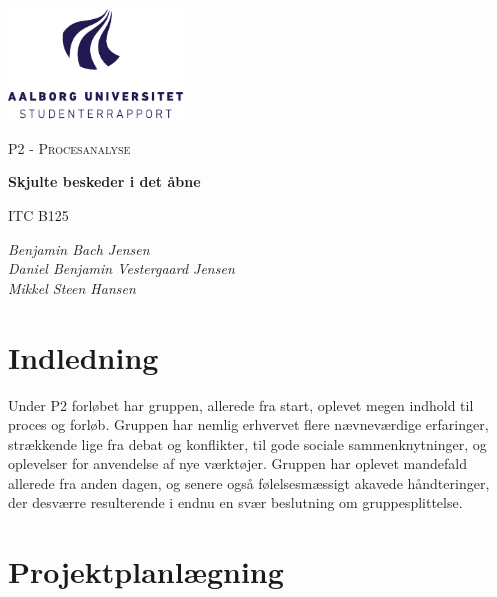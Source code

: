 \documentclass[11pt]{article}
\renewcommand{\baselinestretch}{1.20}
\begin{document}
\begin{titlepage}
    \centering
	\includegraphics[width=0.35\textwidth]{Projectdoc/Assets/Illustrationer/aau_logo_da.pdf}\par\vspace{1cm}
	{\scshape\Large P2 - Procesanalyse\par}
	\vspace{0.2cm}
	{\huge\bfseries Skjulte beskeder i det åbne\par}
	\vspace{0.2cm}
	{\scshape\Large ITC B125\par}
	\vspace{2cm}
	{\Large\itshape 
	    Benjamin Bach Jensen\\
        Daniel Benjamin Vestergaard Jensen\\
    	Mikkel Steen Hansen
    \par}
	\vfill
	\vfill
\end{titlepage}

\renewcommand{\baselinestretch}{0.8} 
\tableofcontents
\renewcommand{\baselinestretch}{1.20} 
\newpage 

\section{Indledning}
Under P2 forløbet har gruppen, allerede fra start, oplevet megen indhold til proces og forløb. Gruppen har nemlig erhvervet flere nævneværdige erfaringer, strækkende lige fra debat og konflikter, til gode sociale sammenknytninger, og oplevelser for anvendelse af nye værktøjer. Gruppen har oplevet mandefald allerede fra anden dagen, og senere også følelsesmæssigt akavede håndteringer, der desværre resulterende i endnu en svær beslutning om gruppesplittelse.

\section{Projektplanlægning}
\end{document}
